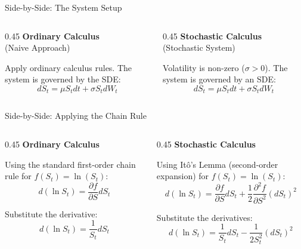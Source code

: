 \documentclass{beamer}
\begin{document}
\begin{frame}{Side-by-Side: The System Setup}
\begin{columns}[T]
\begin{column}{0.45\textwidth}
\textbf{Ordinary Calculus} \\
(Naive Approach)
\vspace{0.3cm}

Apply ordinary calculus rules. The system is governed by the SDE:
\[ dS_t = \mu S_t dt + \sigma S_t dW_t \]
\end{column}
\hfill\vrule\hfill
\begin{column}{0.45\textwidth}
\textbf{Stochastic Calculus} \\
(Stochastic System)
\vspace{0.3cm}

Volatility is non-zero ($\sigma > 0$). The system is governed by an SDE:
\[ dS_t = \mu S_t dt + \sigma S_t dW_t \]
\end{column}
\end{columns}
\end{frame}

\begin{frame}{Side-by-Side: Applying the Chain Rule}
\begin{columns}[T]
\begin{column}{0.45\textwidth}
\textbf{Ordinary Calculus}
\vspace{0.3cm}

Using the standard first-order chain rule for $f(S_t) = \ln(S_t)$:
\[ d(\ln S_t) = \frac{\partial f}{\partial S} dS_t \]

Substitute the derivative:
\[ d(\ln S_t) = \frac{1}{S_t} dS_t \]
\end{column}
\hfill\vrule\hfill
\begin{column}{0.45\textwidth}
\textbf{Stochastic Calculus}
\vspace{0.3cm}

Using It\^o's Lemma (second-order expansion) for $f(S_t) = \ln(S_t)$:
\[ d(\ln S_t) = \frac{\partial f}{\partial S} dS_t + \frac{1}{2}\frac{\partial^2 f}{\partial S^2}(dS_t)^2 \]

Substitute the derivatives:
\[ d(\ln S_t) = \frac{1}{S_t} dS_t - \frac{1}{2S_t^2}(dS_t)^2 \]
\end{column}
\end{columns}
\end{frame}
\end{document}
